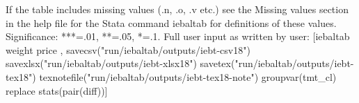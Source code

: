 If the table includes missing values (.n, .o, .v etc.) see the Missing values section in the help file for the Stata command iebaltab for definitions of these values. Significance: ***=.01, **=.05, *=.1. Full user input as written by user: [iebaltab weight price , savecsv("run/iebaltab/outputs/iebt-csv18") savexlsx("run/iebaltab/outputs/iebt-xlsx18") savetex("run/iebaltab/outputs/iebt-tex18") texnotefile("run/iebaltab/outputs/iebt-tex18-note") groupvar(tmt\_cl) replace stats(pair(diff))] 

